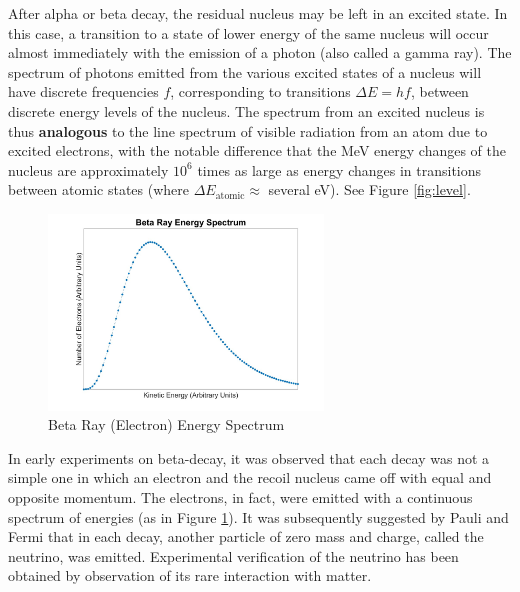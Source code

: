 After alpha or beta decay, the residual nucleus may be left in an excited state. In this case, a transition to a state of lower energy of the same nucleus will occur almost immediately with the emission of a photon (also called a gamma ray). The spectrum of photons emitted from the various excited states of a nucleus will have discrete frequencies $f$, corresponding to transitions $\Delta E=hf$, between discrete energy levels of the nucleus. The spectrum from an excited nucleus is thus \textbf{analogous} to the line spectrum of visible radiation from an atom due to excited electrons, with the notable difference that the MeV energy changes of the nucleus are approximately $10^6$ times as large as energy changes in transitions between atomic states (where $\Delta E_{\mathrm{atomic}}\approx$ several eV). See Figure {\ref{fig:level}}.\myskip

\begin{figure}[h]
\centering
\includegraphics[width=0.65\textwidth]{./Exp10/pic/betaspectrum.jpg}
\caption{Beta Ray (Electron) Energy Spectrum}
\label{fig:betaray}
\end{figure}

In early experiments on beta-decay, it was observed that each decay was not a simple one in which an electron and the recoil nucleus came off with equal and opposite momentum. The electrons, in fact, were emitted with a continuous spectrum of energies (as in Figure {\ref{fig:betaray}}). It was subsequently suggested by Pauli and Fermi that in each decay, another particle of zero mass and charge, called the neutrino, was emitted. Experimental verification of the neutrino has been obtained by observation of its rare interaction with matter.

